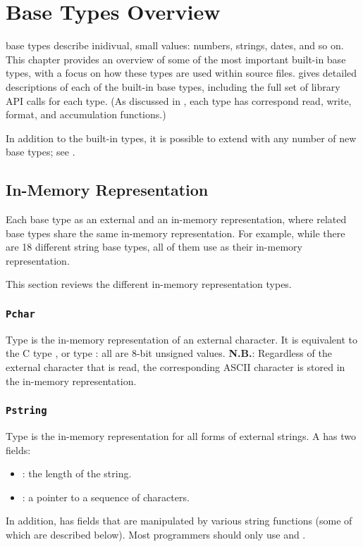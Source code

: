 \chapter{Base Types Overview}
\label{chap:base-types}

\PADSL{} base types describe inidivual, small values: numbers, strings, dates, and so on.
This chapter provides an overview of some of the most important built-in \PADSL{} base types,
with a focus on how these types are used within \PADSL{} source files.
 gives detailed descriptions of each of the built-in base types,
including the full set of library API calls for each type.  (As discussed in
, each type has correspond read, write, format, and accumulation functions.)

In addition to the built-in types, it is possible to extend \PADSL{} with any
number of new base types; see .

\section{In-Memory Representation}
\label{sec:base-types-rep}

Each base type as an external and an in-memory representation, where
related base types share the same in-memory representation.  For
example, while there are 18 different string base types, all of them
use  as their in-memory representation.

This section reviews the different in-memory representation types.

\subsection{{\tt Pchar}}

Type  is the in-memory representation of an external
character.  It is equivalent to the C type , or type
: all are 8-bit unsigned values.  {\bf N.B.}: Regardless of the
external character that is read, the corresponding ASCII character is stored in 
the in-memory representation.

\subsection{{\tt Pstring}}

Type  is the in-memory representation for all forms of
external strings.  A   has two fields:
\begin{itemize}
\item {} : the length of the string.
\item {} : a pointer to a sequence of  characters.
\end{itemize}
In addition,  has fields that are manipulated
by various string functions (some of which are described below).
Most programmers should only use  and .

